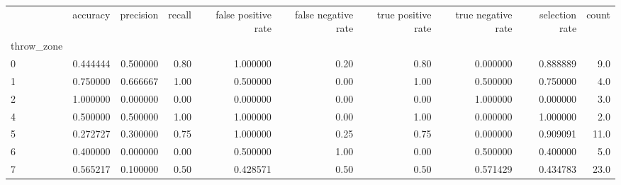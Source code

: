 \begin{tabular}{lrrrrrrrrr}
\toprule
{} &  accuracy &  precision &  recall &  false positive rate &  false negative rate &  true positive rate &  true negative rate &  selection rate &  count \\
throw\_zone &           &            &         &                      &                      &                     &                     &                 &        \\
\midrule
0          &  0.444444 &   0.500000 &    0.80 &             1.000000 &                 0.20 &                0.80 &            0.000000 &        0.888889 &    9.0 \\
1          &  0.750000 &   0.666667 &    1.00 &             0.500000 &                 0.00 &                1.00 &            0.500000 &        0.750000 &    4.0 \\
2          &  1.000000 &   0.000000 &    0.00 &             0.000000 &                 0.00 &                0.00 &            1.000000 &        0.000000 &    3.0 \\
4          &  0.500000 &   0.500000 &    1.00 &             1.000000 &                 0.00 &                1.00 &            0.000000 &        1.000000 &    2.0 \\
5          &  0.272727 &   0.300000 &    0.75 &             1.000000 &                 0.25 &                0.75 &            0.000000 &        0.909091 &   11.0 \\
6          &  0.400000 &   0.000000 &    0.00 &             0.500000 &                 1.00 &                0.00 &            0.500000 &        0.400000 &    5.0 \\
7          &  0.565217 &   0.100000 &    0.50 &             0.428571 &                 0.50 &                0.50 &            0.571429 &        0.434783 &   23.0 \\
\bottomrule
\end{tabular}
